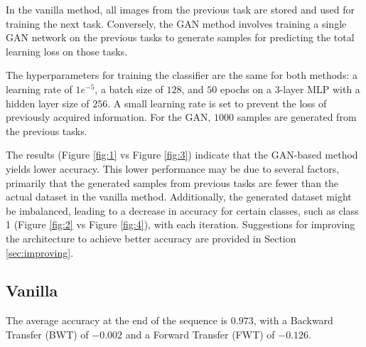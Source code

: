 \documentclass{article}
\begin{document}
In the vanilla method, all images from the previous task are stored and used for training the next task. Conversely, the GAN method involves training a single GAN network on the previous tasks to generate samples for predicting the total learning loss on those tasks.

The hyperparameters for training the classifier are the same for both methods: a learning rate of $1e^{-5}$, a batch size of $128$, and $50$ epochs on a $3$-layer MLP with a hidden layer size of $256$. A small learning rate is set to prevent the loss of previously acquired information. For the GAN, $1000$ samples are generated from the previous tasks.

The results (Figure \ref{fig:1} vs Figure \ref{fig:3}) indicate that the GAN-based method yields lower accuracy. This lower performance may be due to several factors, primarily that the generated samples from previous tasks are fewer than the actual dataset in the vanilla method. Additionally, the generated dataset might be imbalanced, leading to a decrease in accuracy for certain classes, such as class 1 (Figure \ref{fig:2} vs Figure \ref{fig:4}), with each iteration. Suggestions for improving the architecture to achieve better accuracy are provided in Section \ref{sec:improving}.

\subsection{Vanilla}
The average accuracy at the end of the sequence is $0.973$, with a Backward Transfer (BWT) of $-0.002$ and a Forward Transfer (FWT) of $-0.126$.
\end{document}
